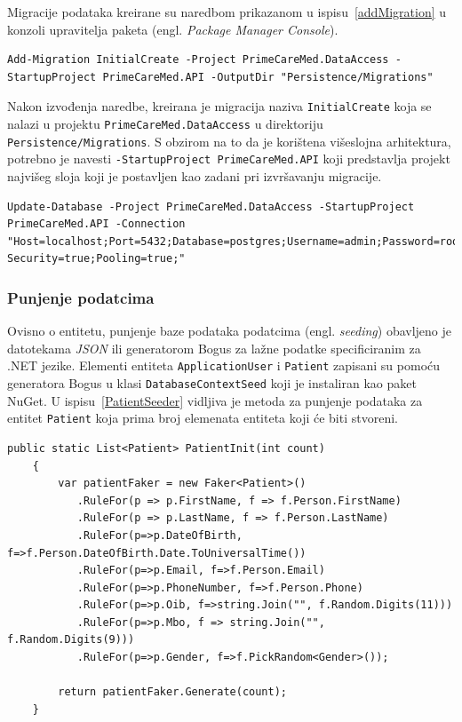 Migracije podataka kreirane su naredbom prikazanom u ispisu~\ref{addMigration} u konzoli upravitelja paketa (engl. \textit{Package Manager Console}). 

\begin{lstlisting}[caption={Naredba za kreiranje migracije}, label=addMigration]
Add-Migration InitialCreate -Project PrimeCareMed.DataAccess -StartupProject PrimeCareMed.API -OutputDir "Persistence/Migrations"
\end{lstlisting}

Nakon izvođenja naredbe, kreirana je migracija naziva \texttt{InitialCreate} koja se nalazi u projektu \texttt{PrimeCareMed.DataAccess} u direktoriju\\\texttt{Persistence/Migrations}. S obzirom na to da je korištena višeslojna arhitektura, potrebno je navesti \texttt{-StartupProject PrimeCareMed.API} koji predstavlja projekt najvišeg sloja koji je postavljen kao zadani pri izvršavanju migracije.

\begin{lstlisting}[caption={Primjena migracije na bazu podataka}, label=updateDatabase]
Update-Database -Project PrimeCareMed.DataAccess -StartupProject PrimeCareMed.API -Connection "Host=localhost;Port=5432;Database=postgres;Username=admin;Password=root;Integrated Security=true;Pooling=true;"
\end{lstlisting}

\subsubsection{Punjenje podatcima}
Ovisno o entitetu, punjenje baze podataka podatcima (engl. \textit{seeding}) obavljeno je datotekama \textit{JSON} ili generatorom Bogus za lažne podatke specificiranim za .NET jezike. Elementi entiteta \texttt{ApplicationUser} i \texttt{Patient} zapisani su pomoću generatora Bogus u klasi \texttt{DatabaseContextSeed} koji je instaliran kao paket NuGet. U ispisu~\ref{PatientSeeder} vidljiva je metoda za punjenje podataka za entitet \texttt{Patient} koja prima broj elemenata entiteta koji će biti stvoreni\cite{bogus1}.

\begin{lstlisting}[caption={Metoda \texttt{PatientInit} za punjenje lažnim podatcima}, label=PatientSeeder]
    public static List<Patient> PatientInit(int count)
    {
        var patientFaker = new Faker<Patient>()
           .RuleFor(p => p.FirstName, f => f.Person.FirstName)
           .RuleFor(p => p.LastName, f => f.Person.LastName)
           .RuleFor(p=>p.DateOfBirth, f=>f.Person.DateOfBirth.Date.ToUniversalTime())
           .RuleFor(p=>p.Email, f=>f.Person.Email)
           .RuleFor(p=>p.PhoneNumber, f=>f.Person.Phone)
           .RuleFor(p=>p.Oib, f=>string.Join("", f.Random.Digits(11)))
           .RuleFor(p=>p.Mbo, f => string.Join("", f.Random.Digits(9)))
           .RuleFor(p=>p.Gender, f=>f.PickRandom<Gender>());

        return patientFaker.Generate(count);
    }
\end{lstlisting}

